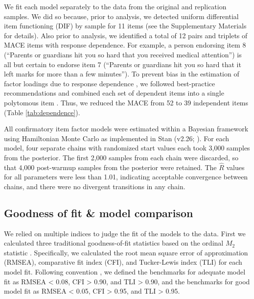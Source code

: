 \documentclass[letterpaper,man,natbib,longtable,floatsintext,12pt]{apa6}
\begin{document}
We fit each model separately to the data from the original and replication samples. We did so because, prior to analysis, we detected uniform differential item functioning (DIF) by sample for 11 items (see the Supplementary Materials for details). Also prior to analysis, we identified a total of 12 pairs and triplets of MACE items with response dependence. For example, a person endorsing item 8 (``Parents or guardians hit you so hard that you received medical attention'') is all but certain to endorse item 7 (``Parents or guardians hit you so hard that it left marks for more than a few minutes''). To prevent bias in the estimation of factor loadings due to response dependence \citep{reise2013applying}, we followed best-practice recommendations and combined each set of dependent items into a single polytomous item \citep{marais2008formalizing}. Thus, we reduced the MACE from 52 to 39 independent items (Table \ref{tab:dependence}).

All confirmatory item factor models were estimated within a Bayesian framework using Hamiltonian Monte Carlo as implemented in Stan (v2.26; \citealt{carpenter2017stan}). For each model, four separate chains with randomized start values each took 3,000 samples from the posterior. The first 2,000 samples from each chain were discarded, so that 4,000 post-warmup samples from the posterior were retained. The $\hat{R}$ values for all parameters were less than 1.01, indicating acceptable convergence between chains, and there were no divergent transitions in any chain. 

\subsection{Goodness of fit \& model comparison}

We relied on multiple indices to judge the fit of the models to the data. First we calculated three traditional goodness-of-fit statistics based on the ordinal $M_2$ statistic \citep{cai2013limited}. Specifically, we calculated the root mean square error of approximation (RMSEA), comparative fit index (CFI), and Tucker-Lewis index (TLI) for each model fit. Following convention \citep{hu1999cutoff}, we defined the benchmarks for adequate model fit as RMSEA < 0.08, CFI > 0.90, and TLI > 0.90, and the benchmarks for good model fit as RMSEA < 0.05, CFI > 0.95, and TLI > 0.95. 
\end{document}
